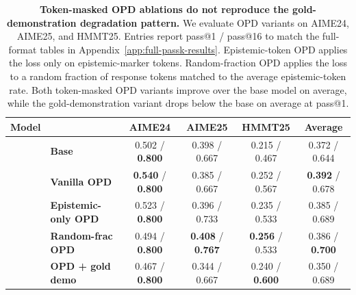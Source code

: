 \begin{table}[!htbp]
\centering
\caption{\textbf{Token-masked OPD ablations do not reproduce the gold-demonstration degradation pattern.}
We evaluate \qwenonesevenb{} OPD variants on AIME24, AIME25, and HMMT25. Entries report pass@1 / pass@16 to match the full-format tables in Appendix~\ref{app:full-passk-results}. Epistemic-token OPD applies the loss only on epistemic-marker tokens. Random-fraction OPD applies the loss to a random fraction of response tokens matched to the average epistemic-token rate. Both token-masked OPD variants improve over the base model on average, while the gold-demonstration variant drops below the base on average at pass@1.}
\label{tab:opd_ablation_passk}
\footnotesize
\setlength{\tabcolsep}{3pt}
\renewcommand{\arraystretch}{1.12}

\newcommand{\metrichead}[1]{%
  \textbf{#1}%
}

\begin{tabular*}{\textwidth}{@{\extracolsep{\fill}}llcccc@{}}
\toprule
\textbf{Model}
&
& \metrichead{AIME24}
& \metrichead{AIME25}
& \metrichead{HMMT25}
& \metrichead{Average} \\
\midrule
\multirow{5}{*}{\textbf{\qwenonesevenb{}}}
& \textbf{Base}
& 0.502 / \textbf{0.800}
& 0.398 / 0.667
& 0.215 / 0.467
& 0.372 / 0.644 \\
&
\textbf{Vanilla OPD}
& \textbf{0.540} / \textbf{0.800}
& 0.385 / 0.667
& 0.252 / 0.567
& \textbf{0.392} / 0.678 \\
&
\textbf{Epistemic-only OPD}
& 0.523 / \textbf{0.800}
& 0.396 / 0.733
& 0.235 / 0.533
& 0.385 / 0.689 \\
&
\textbf{Random-frac OPD}
& 0.494 / \textbf{0.800}
& \textbf{0.408} / \textbf{0.767}
& \textbf{0.256} / 0.533
& 0.386 / \textbf{0.700} \\
&
\textbf{OPD + gold demo}
& 0.467 / \textbf{0.800}
& 0.344 / 0.667
& 0.240 / \textbf{0.600}
& 0.350 / 0.689 \\
\bottomrule
\end{tabular*}
\end{table}

